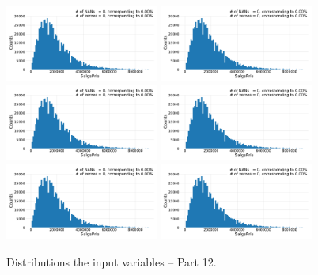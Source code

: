 \begin{figure}
  \subfloat{\qquad}
  \includegraphics[draft=false, width=0.45\textwidth, page=139, trim=15 0 15 0, clip]{figures/housing/overview_fig.pdf}\hfil
  \subfloat{\qquad}
  \includegraphics[draft=false, width=0.45\textwidth, page=140, trim=15 0 15 0, clip]{figures/housing/overview_fig.pdf}
  \subfloat{\qquad}
  \includegraphics[draft=false, width=0.45\textwidth, page=141, trim=15 0 15 0, clip]{figures/housing/overview_fig.pdf}\hfil
  \subfloat{\qquad}
  \includegraphics[draft=false, width=0.45\textwidth, page=142, trim=15 0 15 0, clip]{figures/housing/overview_fig.pdf}
  \subfloat{\qquad}
  \includegraphics[draft=false, width=0.45\textwidth, page=143, trim=15 0 15 0, clip]{figures/housing/overview_fig.pdf}\hfil
  \subfloat{\qquad}
  \includegraphics[draft=false, width=0.45\textwidth, page=144, trim=15 0 15 0, clip]{figures/housing/overview_fig.pdf}
  \caption[Distributions of the Input Variables -- Part 12]{Distributions the input variables -- Part 12.}
  \label{fig:h:variable_overview_all_12}
  \vspace{\abovecaptionskip}
\end{figure}

